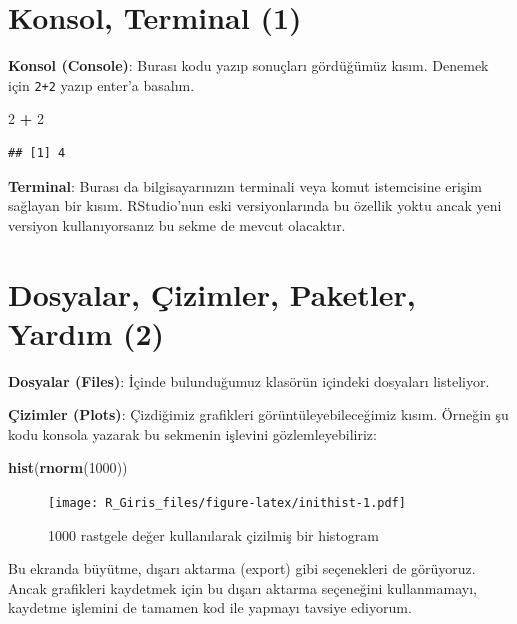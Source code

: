 \documentclass[]{book}
\newenvironment{Shaded}{\begin{snugshade}}{\end{snugshade}}
\newcommand{\DecValTok}[1]{\textcolor[rgb]{0.00,0.00,0.81}{#1}}
\newcommand{\KeywordTok}[1]{\textcolor[rgb]{0.13,0.29,0.53}{\textbf{#1}}}
\newcommand{\NormalTok}[1]{#1}
\newcommand{\OperatorTok}[1]{\textcolor[rgb]{0.81,0.36,0.00}{\textbf{#1}}}
\newcommand{\StringTok}[1]{\textcolor[rgb]{0.31,0.60,0.02}{#1}}
\begin{document}
\hypertarget{konsol-terminal-1}{%
\section{Konsol, Terminal (1)}\label{konsol-terminal-1}}

\textbf{Konsol (Console)}: Burası kodu yazıp sonuçları gördüğümüz kısım.
Denemek için \texttt{2+2} yazıp enter'a basalım.

\begin{Shaded}
\begin{Highlighting}[]
\DecValTok{2} \OperatorTok{+}\StringTok{ }\DecValTok{2}
\end{Highlighting}
\end{Shaded}

\begin{verbatim}
## [1] 4
\end{verbatim}

\textbf{Terminal}: Burası da bilgisayarınızın terminali veya komut
istemcisine erişim sağlayan bir kısım. RStudio'nun eski versiyonlarında
bu özellik yoktu ancak yeni versiyon kullanıyorsanız bu sekme de mevcut
olacaktır.

\hypertarget{dosyalar-cizimler-paketler-yardm-2}{%
\section{Dosyalar, Çizimler, Paketler, Yardım
(2)}\label{dosyalar-cizimler-paketler-yardm-2}}

\textbf{Dosyalar (Files)}: İçinde bulunduğumuz klasörün içindeki
dosyaları listeliyor.

\textbf{Çizimler (Plots)}: Çizdiğimiz grafikleri görüntüleyebileceğimiz
kısım. Örneğin şu kodu konsola yazarak bu sekmenin işlevini
gözlemleyebiliriz:

\begin{Shaded}
\begin{Highlighting}[]
\KeywordTok{hist}\NormalTok{(}\KeywordTok{rnorm}\NormalTok{(}\DecValTok{1000}\NormalTok{))}
\end{Highlighting}
\end{Shaded}

\begin{figure}
\centering
\texttt{[image: R\_Giris\_files/figure-latex/inithist-1.pdf]}
\caption{\label{fig:inithist}1000 rastgele değer kullanılarak çizilmiş bir
histogram}
\end{figure}

Bu ekranda büyütme, dışarı aktarma (export) gibi seçenekleri de
görüyoruz. Ancak grafikleri kaydetmek için bu dışarı aktarma seçeneğini
kullanmamayı, kaydetme işlemini de tamamen kod ile yapmayı tavsiye
ediyorum.
\end{document}

